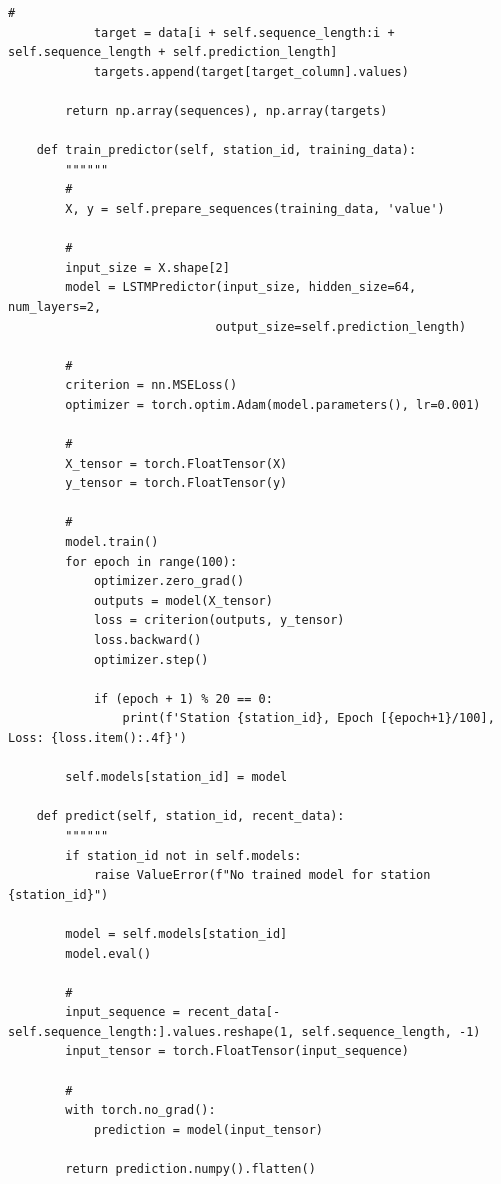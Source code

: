 \begin{lstlisting}[style=python]
            # 
            target = data[i + self.sequence_length:i + self.sequence_length + self.prediction_length]
            targets.append(target[target_column].values)
        
        return np.array(sequences), np.array(targets)
    
    def train_predictor(self, station_id, training_data):
        """"""
        # 
        X, y = self.prepare_sequences(training_data, 'value')
        
        # 
        input_size = X.shape[2]
        model = LSTMPredictor(input_size, hidden_size=64, num_layers=2, 
                             output_size=self.prediction_length)
        
        # 
        criterion = nn.MSELoss()
        optimizer = torch.optim.Adam(model.parameters(), lr=0.001)
        
        # 
        X_tensor = torch.FloatTensor(X)
        y_tensor = torch.FloatTensor(y)
        
        # 
        model.train()
        for epoch in range(100):
            optimizer.zero_grad()
            outputs = model(X_tensor)
            loss = criterion(outputs, y_tensor)
            loss.backward()
            optimizer.step()
            
            if (epoch + 1) % 20 == 0:
                print(f'Station {station_id}, Epoch [{epoch+1}/100], Loss: {loss.item():.4f}')
        
        self.models[station_id] = model
        
    def predict(self, station_id, recent_data):
        """"""
        if station_id not in self.models:
            raise ValueError(f"No trained model for station {station_id}")
        
        model = self.models[station_id]
        model.eval()
        
        # 
        input_sequence = recent_data[-self.sequence_length:].values.reshape(1, self.sequence_length, -1)
        input_tensor = torch.FloatTensor(input_sequence)
        
        # 
        with torch.no_grad():
            prediction = model(input_tensor)
        
        return prediction.numpy().flatten()
\end{lstlisting}

\hypertarget{section-102}{%
\subsection{}\label{section-102}}


